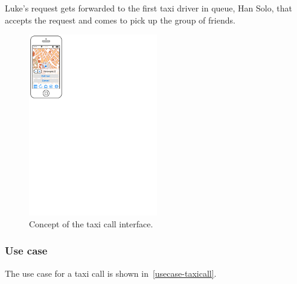 Luke's request gets forwarded to the first taxi driver in queue, Han Solo, that accepts the request and comes to pick up the group of friends.

\begin{figure}
\begin{center}
\includegraphics[width=0.5\textwidth]{mockup/TaxiCall.pdf}
\caption{Concept of the taxi call interface.}
\label{fig:mockup-taxicall}
\end{center}
\end{figure}

\subsubsection{Use case}
The use case for a taxi call is shown in~\autoref{usecase-taxicall}.

